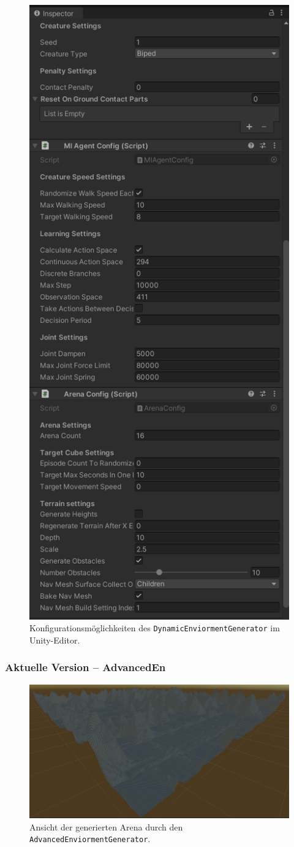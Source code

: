 \begin{figure}
	\centering
	\includegraphics[width=0.4\linewidth]{resources/img/DEGConfig}
	\caption[Konfigurationsmöglichkeiten des \texttt{DynamicEnviormentGenerator}]{Konfigurationsmöglichkeiten des \texttt{DynamicEnviormentGenerator} im Unity-Editor.} 
	\label{bspDEGOptionen}
\end{figure}

\subsubsection{Aktuelle Version -- AdvancedEn}
\begin{figure}
	\centering
	\includegraphics[width=0.7\linewidth]{resources/img/AEGArena.png}
	\caption[Konfigurationsmöglichkeiten des \texttt{AdvancedEnviormentGenerator}]{Ansicht der generierten Arena durch den \texttt{AdvancedEnviormentGenerator}.} 
	\label{bspAEGArena}
\end{figure}

